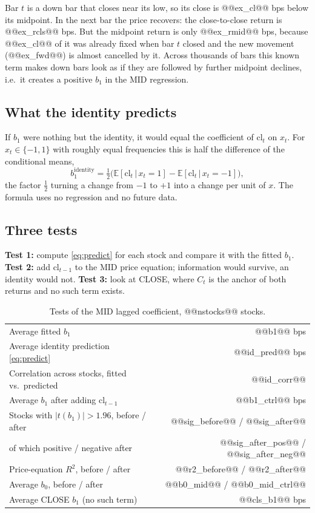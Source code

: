 \documentclass[11pt,a4paper]{article}
\newcommand{\E}{\mathbb{E}}
\begin{document}
Bar $t$ is a down bar that closes near its low, so its close is @@ex_cl@@ bps below its midpoint. In the
next bar the price recovers: the close-to-close return is @@ex_rcls@@ bps. But the midpoint return is
only @@ex_rmid@@ bps, because @@ex_cl@@ of it was already fixed when bar $t$ closed and the new movement
(@@ex_fwd@@) is almost cancelled by it. Across thousands of bars this known term makes down bars look as
if they are followed by further midpoint declines, i.e.\ it creates a positive $b_1$ in the MID
regression.

\subsection{What the identity predicts}

If $b_1$ were nothing but the identity, it would equal the coefficient of $\mathrm{cl}_t$ on $x_t$. For
$x_t\in\{-1,1\}$ with roughly equal frequencies this is half the difference of the conditional means,
\begin{equation}
b_1^{\text{identity}} = \tfrac12\big(\E[\mathrm{cl}_t\,|\,x_t=1]-\E[\mathrm{cl}_t\,|\,x_t=-1]\big),
\label{eq:predict}
\end{equation}
the factor $\tfrac12$ turning a change from $-1$ to $+1$ into a change per unit of $x$. The formula uses no
regression and no future data.

\subsection{Three tests}

\textbf{Test 1:} compute \eqref{eq:predict} for each stock and compare it with the fitted $b_1$.
\textbf{Test 2:} add $\mathrm{cl}_{t-1}$ to the MID price equation; information would survive, an
identity would not. \textbf{Test 3:} look at CLOSE, where $C_t$ is the anchor of both returns and no
such term exists.

\begin{table}[htbp]
\centering
\caption{Tests of the MID lagged coefficient, @@nstocks@@ stocks.}
\label{tab:tests}
\small
\begin{tabular}{@{}lr@{}}
\toprule
Average fitted $b_1$ & @@b1@@ bps \\
Average identity prediction \eqref{eq:predict} & @@id_pred@@ bps \\
Correlation across stocks, fitted vs.\ predicted & @@id_corr@@ \\
\midrule
Average $b_1$ after adding $\mathrm{cl}_{t-1}$ & @@b1_ctrl@@ bps \\
Stocks with $|t(b_1)|>1.96$, before / after & @@sig_before@@ / @@sig_after@@ \\
\quad of which positive / negative after & @@sig_after_pos@@ / @@sig_after_neg@@ \\
Price-equation $R^2$, before / after & @@r2_before@@ / @@r2_after@@ \\
Average $b_0$, before / after & @@b0_mid@@ / @@b0_mid_ctrl@@ \\
\midrule
Average CLOSE $b_1$ (no such term) & @@cls_b1@@ bps \\
\bottomrule
\end{tabular}
\end{table}
\end{document}
